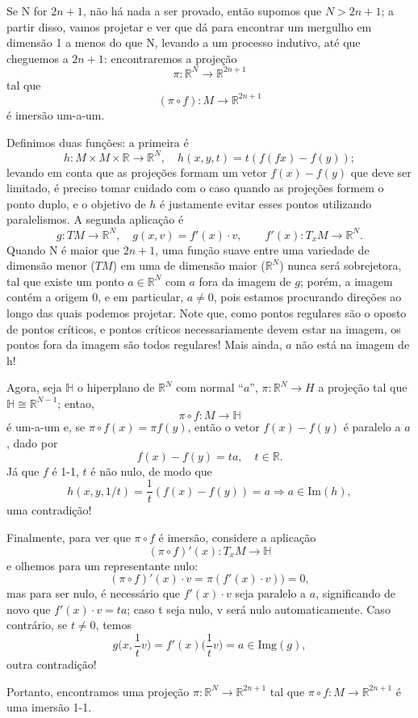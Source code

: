 \documentclass[../differential_topology.tex]{subfiles}
\begin{document}
Se N for \(2n+1\), não há nada a ser provado, então supomos que \(N > 2n+1\); a partir disso, vamos projetar e ver que dá para encontrar um mergulho em dimensão 1 a menos do que N, levando a um processo indutivo, até que cheguemos a \(2n+1\): encontraremos a projeção
\[
	\pi :\mathbb{R}^{N}\rightarrow \mathbb{R}^{2n+1}
\]
tal que
\[
	(\pi \circ f):M\rightarrow \mathbb{R}^{2n+1}
\]
é imersão um-a-um.

Definimos duas funções: a primeira é
\[
	h:M\times M \times \mathbb{R}\rightarrow \mathbb{R}^{N}, \quad h(x, y, t) = t(f(fx)-f(y));
\]
levando em conta que as projeções formam um vetor \(f(x)-f(y)\) que deve ser limitado, é preciso tomar cuidado com o caso quando as projeções formem o ponto duplo, e o objetivo de \(h\) é justamente evitar esses pontos utilizando paralelismos.
A segunda aplicação é
\[
	g:TM\rightarrow \mathbb{R}^{N}, \quad g(x, v) = f'(x)\cdot v, \quad \quad f'(x):T_{x}M\rightarrow \mathbb{R}^{N}.
\]
Quando N é maior que \(2n+1\), uma função suave entre uma variedade de dimensão menor (\(TM\)) em uma de dimensão maior (\(\mathbb{R}^{N}\)) nunca será sobrejetora, tal que existe um ponto \(a\in \mathbb{R}^{N}\) com \(a\) fora da imagem de \(g\); porém, a imagem contém a origem \(0\), e em particular, \(a\neq 0\), pois estamos procurando direções ao longo das quais podemos projetar.
Note que, como pontos regulares são o oposto de pontos críticos, e pontos críticos necessariamente devem estar na imagem, os pontos fora da imagem são todos regulares! Mais ainda, \(a\) não está na imagem de h!

Agora, seja \(\mathbb{H}\) o hiperplano de \(\mathbb{R}^{N}\) com normal ``\(a\)'', \(\pi :\mathbb{R}^{N}\rightarrow H\) a projeção tal que \(\mathbb{H}\cong \mathbb{R}^{N-1}\); entao,
\[
	\pi \circ f:M\rightarrow \mathbb{H}
\]
é um-a-um e, se \(\pi \circ f(x) = \pi f(y)\), então o vetor \(f(x)-f(y)\) é paralelo a \(a\), dado por
\[
	f(x)-f(y) = ta, \quad t\in \mathbb{R}.
\]
Já que \(f\) é 1-1, \(t\) é não nulo, de modo que
\[
	h(x, y, 1/t) = \frac{1}{t}(f(x)-f(y))= a \Rightarrow a\in \mathrm{Im}(h),
\]
uma contradição!

Finalmente, para ver que \(\pi \circ f\) é imersão, considere a aplicação
\[
	(\pi \circ f)'(x):T_{x}M\rightarrow \mathbb{H}
\]
e olhemos para um representante nulo:
\[
	(\pi \circ f)'(x)\cdot v = \pi (f'(x)\cdot v)) = 0,
\]
mas para ser nulo, é necessário que \(f'(x)\cdot v\) seja paralelo a \(a\), significando de novo que \(f'(x)\cdot v = ta\); caso t seja nulo, v será nulo automaticamente. Caso contrário, se \(t\neq 0\), temos
\[
	g \biggl(x, \frac{1}{t}v\biggr) = f'(x) \biggl(\frac{1}{t}v\biggr) = a \in \mathrm{Img}(g),
\]
outra contradição!

Portanto, encontramos uma projeção \(\pi :\mathbb{R}^{N}\rightarrow \mathbb{R}^{2n+1}\) tal que \(\pi \circ f:M\rightarrow \mathbb{R}^{2n+1}\) é uma imersão 1-1.
\end{document}
